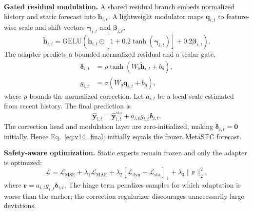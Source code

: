 \documentclass[lettersize,journal]{IEEEtran}
\begin{document}
\textbf{Gated residual modulation.} A shared residual branch embeds normalized history and static forecast into $\mathbf h_{i,t}$. A lightweight modulator maps $\mathbf q_{i,t}$ to feature-wise scale and shift vectors $\boldsymbol\gamma_{i,t}$ and $\boldsymbol\beta_{i,t}$,
\begin{equation}
\tilde{\mathbf h}_{i,t}=\mathrm{GELU}\!\left(\mathbf h_{i,t}\odot[1+0.2\tanh(\boldsymbol\gamma_{i,t})]+0.2\boldsymbol\beta_{i,t}\right).
\end{equation}
The adapter predicts a bounded normalized residual and a scalar gate,
\begin{align}
\boldsymbol\delta_{i,t}&=\rho\tanh(W_\delta\tilde{\mathbf h}_{i,t}+b_\delta),\\
g_{i,t}&=\sigma(W_g\mathbf q_{i,t}+b_g),
\end{align}
where $\rho$ bounds the normalized correction. Let $a_{i,t}$ be a local scale estimated from recent history. The final prediction is
\begin{equation}
\hat{\mathbf y}_{i,t}=\hat{\mathbf y}^{\mathrm{sta}}_{i,t}+a_{i,t}g_{i,t}\boldsymbol\delta_{i,t}.
\label{eq:v14_final}
\end{equation}
The correction head and modulation layer are zero-initialized, making $\boldsymbol\delta_{i,t}=\mathbf 0$ initially. Hence Eq.~\eqref{eq:v14_final} initially equals the frozen MetaSTC forecast.

\textbf{Safety-aware optimization.} Static experts remain frozen and only the adapter is optimized:
\begin{equation}
\mathcal L=\mathcal L_{\mathrm{MSE}}+\lambda_1\mathcal L_{\mathrm{MAE}}+\lambda_2[\mathcal L_{\mathrm{dyn}}-\mathcal L_{\mathrm{sta}}]_++\lambda_3\lVert\mathbf r\rVert_2^2,
\end{equation}
where $\mathbf r=a_{i,t}g_{i,t}\boldsymbol\delta_{i,t}$. The hinge term penalizes samples for which adaptation is worse than the anchor; the correction regularizer discourages unnecessarily large deviations.
\end{document}
